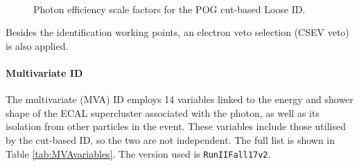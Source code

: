 \begin{figure}
  \\
  \caption{Photon efficiency scale factors for the POG cut-based Loose ID.}
  \label{fig:phEffSF}
\end{figure}

Besides the identification working points, an electron veto selection (CSEV veto) is also applied.



\paragraph{Multivariate ID\\}
The multivariate (MVA) ID employs 14 variables linked to the energy and shower shape of the ECAL supercluster associated with the photon, as well as its isolation from other particles in the event.
These variables include those utilised by the cut-based ID, so the two are not independent.
The full list is shown in Table \ref{tab:MVAvariables}.
The version used is \texttt{RunIIFall17v2}.


